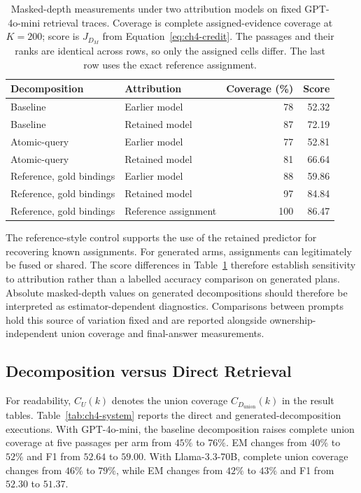 \begin{table}[htbp]
\centering
\caption{Masked-depth measurements under two attribution models on fixed
GPT-4o-mini retrieval traces. Coverage is complete assigned-evidence coverage
at $K=200$; score is $J_{D_M}$ from Equation~\ref{eq:ch4-credit}. The
passages and their ranks are identical across rows, so only the assigned cells
differ. The last row uses the exact reference assignment.}
\label{tab:ch4-masks}
\small
\begin{tabular}{llrr}
\hline
Decomposition & Attribution & Coverage (\%) & Score \\
\hline
Baseline & Earlier model & 78 & 52.32 \\
Baseline & Retained model & 87 & 72.19 \\
Atomic-query & Earlier model & 77 & 52.81 \\
Atomic-query & Retained model & 81 & 66.64 \\
Reference, gold bindings & Earlier model & 88 & 59.86 \\
Reference, gold bindings & Retained model & 97 & 84.84 \\
Reference, gold bindings & Reference assignment & 100 & 86.47 \\
\hline
\end{tabular}
\end{table}

The reference-style control supports the use of the retained predictor for
recovering known assignments. For generated arms, assignments can legitimately
be fused or shared. The score differences in Table~\ref{tab:ch4-masks}
therefore establish sensitivity to attribution rather than a labelled accuracy
comparison on generated plans. Absolute masked-depth values on generated decompositions
should therefore be interpreted as estimator-dependent diagnostics. Comparisons between 
prompts hold this source of variation fixed and are reported alongside ownership-independent 
union coverage and final-answer measurements.

\subsection{Decomposition versus Direct Retrieval}

For readability, $C_U(k)$ denotes the union coverage
$C_{D_{\mathrm{union}}}(k)$ in the result tables.
Table~\ref{tab:ch4-system} reports the direct and generated-decomposition
executions. With GPT-4o-mini, the baseline decomposition raises complete union
coverage at five passages per arm from $45\%$ to $76\%$. EM changes from
$40\%$ to $52\%$ and F1 from $52.64$ to $59.00$. With Llama-3.3-70B,
complete union coverage changes from $46\%$ to $79\%$, while EM changes from
$42\%$ to $43\%$ and F1 from $52.30$ to $51.37$.

